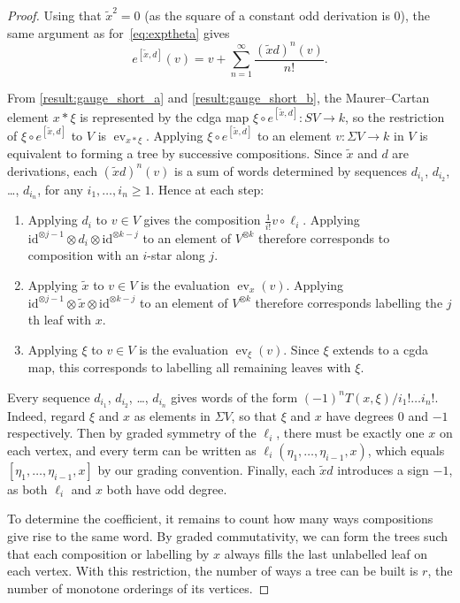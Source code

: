 \documentclass[a4paper,reqno]{amsart}
\theoremstyle{plain}
\theoremstyle{definition}
\theoremstyle{remark}
\newcommand{\id}{\mathrm{id}}
\DeclareMathOperator{\ev}{ev}
\begin{document}
\begin{proof} 
  Using that $\tilde{x}^2 = 0$ (as the square of a constant odd derivation is 0), the same argument as for~\eqref{eq:exptheta} gives
  \[
    e^{[\tilde{x},d]} (v) = v + \sum_{n=1}^{\infty} \frac{(\tilde{x}d)^n(v)}{n!}.
  \]

  From \cref{result:gauge_short_a} and \cref{result:gauge_short_b}, the Maurer--Cartan element $x * \xi$ is represented by the cdga map $\xi \circ e^{[\tilde{x},d]} \colon SV \to k$, so the restriction of $\xi \circ e^{[\tilde{x},d]}$ to $V$ is $\ev_{x * \xi}$. 
  Applying $\xi \circ e^{[\tilde{x},d]}$ to an element $v \colon \Sigma V \to k$ in $V$ is equivalent to forming a tree by successive compositions.
  Since $\tilde{x}$ and $d$ are derivations, each $(\tilde{x}d)^n (v)$ is a sum of words determined by sequences $d_{i_1}$, $d_{i_2}$, \dots, $d_{i_n}$, for any $i_1, \dots, i_n \geq 1$. 
  Hence at each step:
  \begin{enumerate}
    \item Applying $d_i$ to $v \in V$ gives the composition $\frac{1}{i!} v \circ \ell_i$. 
      Applying $\id^{\otimes j-1} \otimes d_i \otimes \id^{\otimes k-j}$ to an element of $V^{\otimes k}$ therefore corresponds to composition with an $i$-star along $j$. 
    \item Applying $\tilde{x}$ to $v \in V$ is the evaluation $\ev_x(v)$. 
      Applying $\id^{\otimes j-1} \otimes \tilde{x} \otimes \id^{\otimes k-j}$ to an element of $V^{\otimes k}$ therefore corresponds labelling the $j$th leaf with $x$. 
    \item Applying $\xi$ to $v \in V$ is the evaluation $\ev_{\xi}(v)$. 
      Since $\xi$ extends to a cgda map, this corresponds to labelling all remaining leaves with $\xi$.
  \end{enumerate}

  Every sequence $d_{i_1}$, $d_{i_2}$, \dots, $d_{i_n}$ gives words of the form $(-1)^n T(x,\xi) / i_1! \dots i_n! $. Indeed, regard $\xi$ and $x$ as elements in $\Sigma V$, so that $\xi$ and $x$ have degrees 0 and $-1$ respectively.
  Then by graded symmetry of the $\ell_i$, there must be exactly one $x$ on each vertex, and every term can be written as $\ell_i(\eta_1,\dots,\eta_{i-1},x)$, which equals $[\eta_1,\dots,\eta_{i-1},x]$ by our grading convention.
  Finally, each $\tilde{x}d$ introduces a sign $-1$, as both $\ell_i$ and $x$ both have odd degree.

  To determine the coefficient, it remains to count how many ways compositions give rise to the same word.
  By graded commutativity, we can form the trees such that each composition or labelling by $x$ always fills the last unlabelled leaf on each vertex.
  With this restriction, the number of ways a tree can be built is $r$, the number of monotone orderings of its vertices.
\end{proof}
\end{document}
